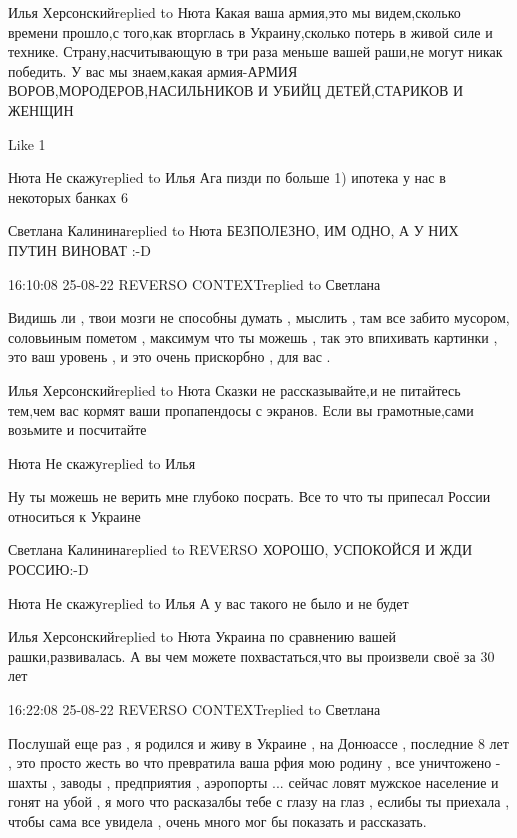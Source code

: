  
 
 
 
 

Илья Херсонскийreplied to Нюта
Какая ваша армия,это мы видем,сколько времени прошло,с того,как вторглась  в Украину,сколько потерь в живой силе и технике. Страну,насчитывающую в три раза меньше вашей раши,не могут никак победить. У вас мы знаем,какая армия-АРМИЯ ВОРОВ,МОРОДЕРОВ,НАСИЛЬНИКОВ И УБИЙЦ ДЕТЕЙ,СТАРИКОВ И ЖЕНЩИН

    Like 1

Нюта Не скажуreplied to Илья
Ага пизди по больше 1) ипотека у нас в некоторых банках 6%

Светлана Калининаreplied to Нюта
БЕЗПОЛЕЗНО, ИМ ОДНО, А У НИХ ПУТИН ВИНОВАТ :-D

16:10:08 25-08-22
REVERSO CONTEXTreplied to Светлана

Видишь ли , твои мозги не способны думать , мыслить , там все забито мусором,
соловьиным пометом , максимум что ты можешь , так это впихивать картинки , это
ваш уровень , и это очень прискорбно , для вас .

Илья Херсонскийreplied to Нюта
Сказки не рассказывайте,и не питайтесь тем,чем вас кормят ваши пропапендосы с экранов. Если вы грамотные,сами возьмите и посчитайте

Нюта Не скажуreplied to Илья

Ну ты можешь не верить мне глубоко посрать. Все то что ты припесал России
относиться к Украине

Светлана Калининаreplied to REVERSO
ХОРОШО, УСПОКОЙСЯ И ЖДИ РОССИЮ:-D

Нюта Не скажуreplied to Илья
А у вас такого не было и не будет

Илья Херсонскийreplied to Нюта
Украина по сравнению вашей рашки,развивалась. А вы чем можете похвастаться,что вы произвели своё за 30 лет

16:22:08 25-08-22
REVERSO CONTEXTreplied to Светлана

Послушай еще раз , я родился и живу в Украине , на Донюассе , последние 8 лет ,
это просто жесть во что превратила ваша рфия мою родину , все уничтожено -
шахты , заводы , предприятия , аэропорты ... сейчас ловят мужское население и
гонят на убой , я мого что расказалбы тебе с глазу на глаз , еслибы ты приехала
, чтобы сама все увидела , очень много мог бы показать и рассказать.
